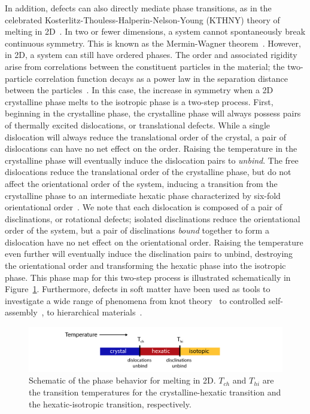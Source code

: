 In addition, defects can also directly mediate phase transitions, as in the celebrated Kosterlitz-Thouless-Halperin-Nelson-Young (KTHNY) theory of melting in 2D~\cite{RN161,RN162,RN163}.
In two or fewer dimensions, a system cannot spontaneously break continuous symmetry.
This is known as the Mermin-Wagner theorem~\cite{RN175}.
However, in 2D, a system can still have ordered phases.
The order and associated rigidity arise from correlations between the constituent particles in the material; the two-particle correlation function decays as a power law in the separation distance between the particles~\cite{RN175}.
In this case, the increase in symmetry when a 2D crystalline phase melts to the isotropic phase is a two-step process.
First, beginning in the crystalline phase, the crystalline phase will always possess pairs of thermally excited dislocations, or translational defects.
While a single dislocation will always reduce the translational order of the crystal, a pair of dislocations can have no net effect on the order.
Raising the temperature in the crystalline phase will eventually induce the dislocation pairs to \emph{unbind}.
The free dislocations reduce the translational order of the crystalline phase, but do not affect the orientational order of the system, inducing a transition from the crystalline phase to an intermediate hexatic phase characterized by six-fold orientational order~\cite{RN61,RN203}.
We note that each dislocation is composed of a pair of disclinations, or rotational defects; isolated disclinations reduce the orientational order of the system, but a pair of disclinations \emph{bound} together to form a dislocation have no net effect on the orientational order.
Raising the temperature even further will eventually induce the disclination pairs to unbind, destroying the orientational order and transforming the hexatic phase into the isotropic phase.
This phase map for this two-step process is illustrated schematically in Figure~\ref{f:1-KTHNY}.
Furthermore, defects in soft matter have been used as tools to investigate a wide range of phenomena from knot theory~\cite{RN156,RN277} to controlled self-assembly~\cite{RN43,RN50,RN150,RN157}, to hierarchical materials~\cite{RN164,RN159,RN27}.
\begin{figure}
  \centering
  \includegraphics{figures/C1/Ch1-Figs_KTHNY.png}
  \caption{Schematic of the phase behavior for melting in 2D.
  $T_{ch}$ and $T_{hi}$ are the transition temperatures for the crystalline-hexatic transition and the hexatic-isotropic transition, respectively.
  }\label{f:1-KTHNY}
\end{figure}

